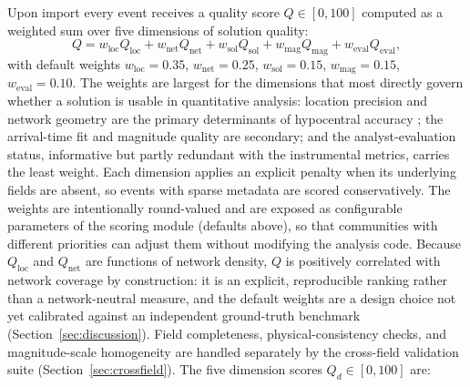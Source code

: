 \documentclass[12pt]{article}
\begin{document}
Upon import every event receives a quality score $Q \in [0,100]$ computed as
a weighted sum over five dimensions of solution quality:
\begin{equation}
  Q = w_{\text{loc}} Q_{\text{loc}}
    + w_{\text{net}} Q_{\text{net}}
    + w_{\text{sol}} Q_{\text{sol}}
    + w_{\text{mag}} Q_{\text{mag}}
    + w_{\text{eval}} Q_{\text{eval}},
  \label{eq:quality}
\end{equation}
with default weights $w_{\text{loc}} = 0.35$, $w_{\text{net}} = 0.25$,
$w_{\text{sol}} = 0.15$, $w_{\text{mag}} = 0.15$, $w_{\text{eval}} = 0.10$.
The weights are largest for the dimensions that most directly govern whether a
solution is usable in quantitative analysis: location precision and network
geometry are the primary determinants of hypocentral accuracy
\citep{bondar2004,warrensmith2025}; the arrival-time fit and magnitude quality
are secondary; and the analyst-evaluation status, informative but partly
redundant with the instrumental metrics, carries the least weight.  Each
dimension applies an explicit penalty when its underlying fields are absent,
so events with sparse metadata are scored conservatively.  The weights are
intentionally round-valued and are exposed as configurable parameters of the
scoring module (defaults above), so that communities with different priorities
can adjust them without modifying the analysis code.  Because $Q_{\text{loc}}$
and $Q_{\text{net}}$ are functions of network density, $Q$ is positively
correlated with network coverage by construction: it is an explicit,
reproducible ranking rather than a network-neutral measure, and the default
weights are a design choice not yet calibrated against an independent
ground-truth benchmark (Section~\ref{sec:discussion}).  Field completeness,
physical-consistency checks, and magnitude-scale homogeneity are handled
separately by the cross-field validation suite (Section~\ref{sec:crossfield}).
The five dimension scores $Q_d \in [0,100]$ are:
\end{document}
